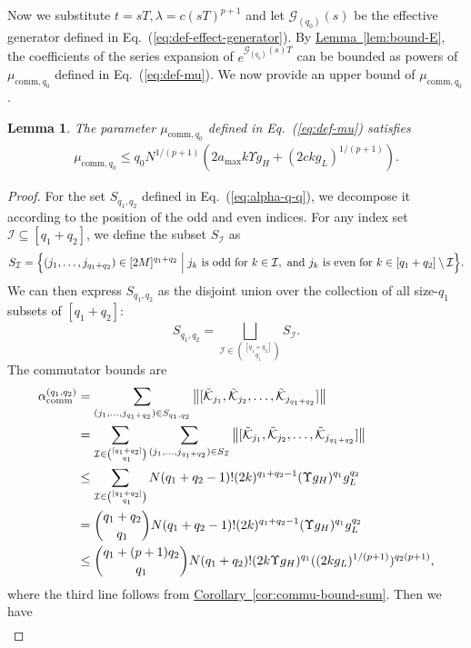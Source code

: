 \documentclass[11pt]{article}
\newtheorem{lemma}{Lemma}
\newcommand{\eq}[1]{(\ref{eq:#1})}
\newcommand{\cor}[1]{\hyperref[cor:#1]{Corollary~\ref*{cor:#1}}}
\newcommand{\lem}[1]{\hyperref[lem:#1]{Lemma~\ref*{lem:#1}}}
\newcommand{\G}{\mathcal{G}}
\newcommand{\mc}{\mathcal}
\begin{document}
Now we substitute $t = sT, \lambda = c (sT)^{p+1}$ and let $\G_{(q_0)}(s)$ be the effective generator defined in Eq.~\eq{def-effect-generator}. By \lem{bound-E}, the coefficients of the series expansion of $e^{\G_{(q_0)}(s)T}$ can be bounded as powers of $\mu_{\mathrm{comm},q_0}$ defined in Eq.~\eq{def-mu}. We now provide an upper bound of $\mu_{\mathrm{comm},q_0}$. 
\begin{lemma}
\label{lem:bound-mu}
    The parameter $\mu_{\mathrm{comm},q_0}$ defined in Eq.~\eq{def-mu} satisfies \begin{align*}
        \mu_{\mathrm{comm},q_0} \le q_0 N^{1/(p+1)}(2a_{\max}k \Upsilon g_H+ (2ckg_L)^{1/(p+1)}).
    \end{align*}
\end{lemma}
\begin{proof}
    For the set $S_{q_1, q_2}$ defined in Eq.~\eq{alpha-q-q}, we decompose it according to the position of the odd and even indices.  For any index set $\mathcal{I} \subseteq [q_1+q_2]$, we define the subset $S_{\mathcal{I}}$ as
    \[
    S_{\mathcal{I}} = \Bigl\{ (j_1, \ldots, j_{q_1+q_2}) \in [2M]^{q_1+q_2} \Bigm| 
        j_k \text{ is odd for } k \in \mathcal{I}, \text{ and } 
        j_k \text{ is even for } k \in [q_1+q_2] \setminus \mathcal{I}
    \Bigr\}.
    \]
    We can then express $S_{q_1, q_2}$ as the disjoint union over the collection of all size-$q_1$ subsets of $[q_1+q_2]$:
    \[
    S_{q_1, q_2} = \bigsqcup_{\mathcal{I} \in \binom{[q_1+q_2]}{q_1}} S_{\mathcal{I}}.
    \]
    The commutator bounds are \begin{align*}
    \alpha_{\rm comm}^{(q_1,q_2)} &=  \sum_{(j_1, \ldots, j_{q_1+q_2})\in S_{q_1, q_2}}\big\|[\tilde{\mc K}_{j_1}, \tilde{\mc K}_{j_2},\ldots,\tilde{\mc K}_{j_{q_1+q_2}}]\big\|\\
    &= \sum_{\mc I\in \binom{[q_1+q_2]}{q_1}}\sum_{(j_1, \ldots, j_{q_1+q_2})\in S_{\mc I}}\big\|[\tilde{\mc K}_{j_1}, \tilde{\mc K}_{j_2},\ldots,\tilde{\mc K}_{j_{q_1+q_2}}]\big\|\\
    &\le \sum_{\mc I\in \binom{[q_1+q_2]}{q_1}} N(q_1+q_2-1)!(2k)^{q_1+q_2-1}(\Upsilon g_H)^{q_1}g_L^{q_2}\\
    &= \binom{q_1+q_2}{q_1}N(q_1+q_2-1)!(2k)^{q_1+q_2-1}(\Upsilon g_H)^{q_1}g_L^{q_2}\\
    &\le \binom{q_1+(p+1)q_2}{q_1}N(q_1+q_2)!(2k\Upsilon g_H)^{q_1}((2kg_L)^{1/(p+1)})^{q_2(p+1)},
    \end{align*}
    where the third line follows from \cor{commu-bound-sum}. Then we have  \begin{align*}

\end{align*}
\end{proof}
\end{document}
